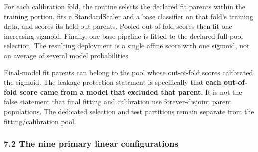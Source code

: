 \documentclass[
  11pt,
  a4paper,
]{article}
\begin{document}
For each calibration fold, the routine selects the declared fit parents
within the training portion, fits a StandardScaler and a base classifier
on that fold's training data, and scores its held-out parents. Pooled
out-of-fold scores then fit one increasing sigmoid. Finally, one base
pipeline is fitted to the declared full-pool selection. The resulting
deployment is a single affine score with one sigmoid, not an average of
several model probabilities.

Final-model fit parents can belong to the pool whose out-of-fold scores
calibrated the sigmoid. The leakage-protection statement is specifically
that \textbf{each out-of-fold score came from a model that excluded that
parent}. It is not the false statement that final fitting and
calibration use forever-disjoint parent populations. The dedicated
selection and test partitions remain separate from the
fitting/calibration pool.

\subsubsection{7.2 The nine primary linear
configurations}\label{the-nine-primary-linear-configurations}
\end{document}
